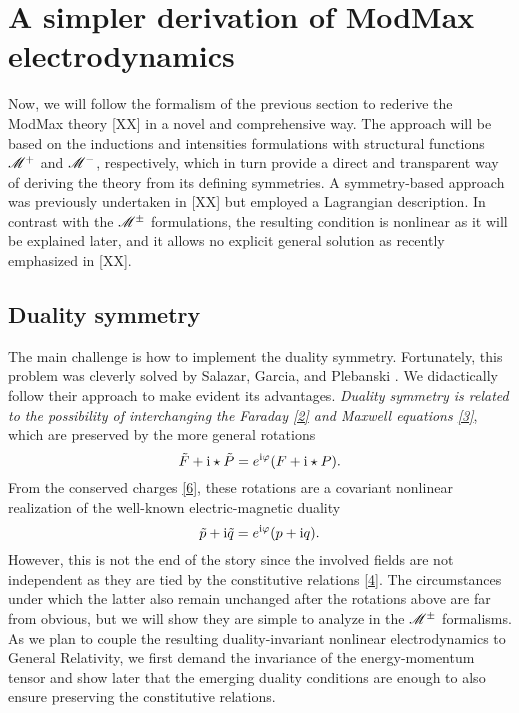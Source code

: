 \section{A simpler derivation of ModMax electrodynamics}
Now, we will follow the formalism of the previous section to rederive the ModMax theory [XX] in a novel and comprehensive way. The approach will be based on the inductions and intensities formulations with structural functions $\mathscr{M}^+$ and $\mathscr{M}^-$, respectively, which in turn provide a direct and transparent way of deriving the theory from its defining symmetries. A symmetry-based approach was previously undertaken in [XX] but employed a Lagrangian description. In contrast with the $\mathscr{M}^{\pm }$ formulations, the resulting condition is nonlinear as it will be explained later, and it allows no explicit general solution as recently emphasized in [XX].

\subsection{Duality symmetry}
The main challenge is how to implement the duality symmetry. Fortunately, this problem was cleverly solved by Salazar, Garcia, and Plebanski \cite{Salazar:1987ap}. We didactically follow their approach to make evident its advantages. \textit{Duality symmetry is related to the possibility of interchanging the Faraday \eqref{2} and Maxwell equations \eqref{3}}, which are preserved by the more general rotations
\begin{equation}\label{17}
  \tilde{F}+\mathrm{i} \star\tilde{P}=e^{\mathrm{i} \varphi}(F+\mathrm{i} \star P).
\end{equation}
From the conserved charges \eqref{6}, these rotations are a covariant nonlinear realization of the well-known electric-magnetic duality
\begin{equation}\label{18}
  \tilde{p}+\mathrm{i} \tilde{q}=e^{\mathrm{i} \varphi}(p+\mathrm{i} q).
\end{equation}
However, this is not the end of the story since the involved fields are not independent as they are tied by the constitutive relations \eqref{4}. The circumstances under which the latter also remain unchanged after the rotations above are far from obvious, but we will show they are simple to analyze in the $\mathscr{M}^{\pm }$ formalisms. As we plan to couple the resulting duality-invariant nonlinear electrodynamics to General Relativity, we first demand the invariance of the energy-momentum tensor and show later that the emerging duality conditions are enough to also ensure preserving the constitutive relations.


